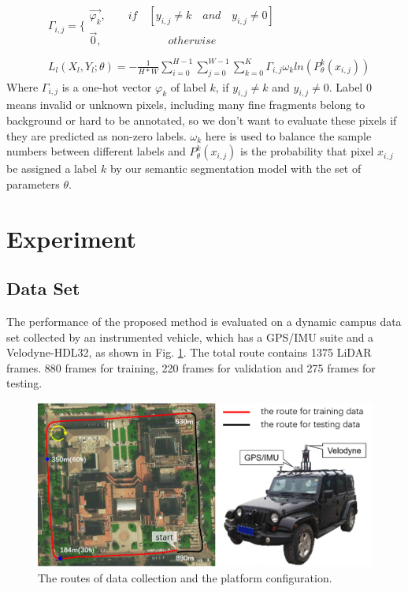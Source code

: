 \begin{equation}
\begin{split}
&\varGamma_{i,j}=\{
	\begin{array}{lr}
	\overrightarrow{\varphi_k} ,\quad\quad if \quad [y_{i,j}\neq k \quad and\quad y_{i,j}\neq0]	\\
	\overrightarrow{0} ,\quad\quad\quad\quad\quad\quad  otherwise
	\end{array}	\\
	\\
&\textit{}L_l(X_l,Y_l;\theta)=-\frac{1}{H*W}\sum_{i=0}^{H-1}\sum_{j=0}^{W-1}\sum_{k=0}^K{\varGamma_{i,j}\omega_{k}ln(P^k_{\theta}(x_{i,j}))}
\end{split}
\end{equation}
Where $\varGamma_{i,j}$ is a one-hot vector $\varphi_k$ of label $k$, if $y_{i,j}\neq k$ and $y_{i,j}\neq0$. Label 0 means invalid or unknown pixels, including many fine fragments belong to background or hard to be annotated, so we don't want to evaluate these pixels if they are predicted as non-zero labels. $\omega_{k}$ here is used to balance the sample numbers between different labels and $P^k_{\theta}(x_{i,j})$ is the probability that pixel $x_{i,j}$ be assigned a label $k$ by our semantic segmentation model with the set of parameters $\theta$.


\section{Experiment}
\subsection{Data Set}
The performance of the proposed method is evaluated on a dynamic campus data set collected by an instrumented vehicle, which has a GPS/IMU suite and a Velodyne-HDL32, as shown in Fig. \ref{fig:collect_route}. The total route contains 1375 LiDAR frames. 880 frames for training, 220 frames for validation and 275 frames for testing.

\begin{figure}[ht]
\centering
\includegraphics[width=1.0\linewidth]{fig/collect_route}
\caption{The routes of data collection and the platform configuration.}
\label{fig:collect_route}
\end{figure}


